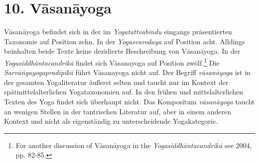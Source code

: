 \section{10. Vāsanāyoga}
\label{vasanayogaintro}

Vāsanāyoga befindet sich in der im \textit{Yogatattvabindu} eingangs präsentierten Taxonomie auf Position zehn. In der \textit{Yogasvarodaya} auf Position acht. Alldings beinhalten beide Texte keine dezidierte Beschreibung von Vāsanāyoga. In der \textit{Yogasiddhāntacandrikā} findet sich Vāsanayoga auf Position zwölf.\footnote{For another discussion of Vāsanāyoga in the \textit{Yogasiddhāntacandrikā} see \citeauthor{penna2004} 2004, pp. 82-85.} Die \textit{Sarvāṅgayogapradīpikā} führt Vāsanayoga nicht auf. Der Begriff \textit{vāsanāyoga} ist in der gesamten Yogaliteratur äußerst selten und taucht nur im Kontext der spätmittelalterlichen Yogataxonomien auf. In den frühen und mittelalterlichen Texten des Yoga findet sich überhaupt nicht. Das Kompositum \textit{vāsanāyoga} taucht an wenigen Stellen in der tantrischen Literatur auf, aber in einem anderen Kontext und nicht als eigenständig zu unterscheidende Yogakategorie.  

